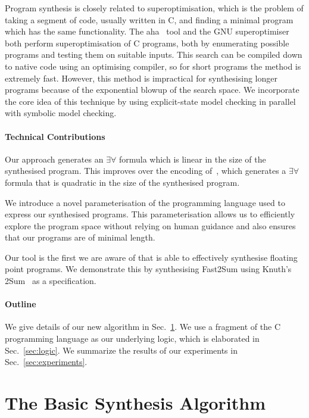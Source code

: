 \documentclass[a4paper]{llncs}
\begin{document}
Program synthesis is closely related to
superoptimisation, which is the problem of taking a
segment of code, usually written in C, and finding a minimal program which
has the same functionality.  The {\sc aha}~\cite{aha-paper,aha-website} tool and the GNU
superoptimiser~\cite{gnu-superoptimiser} both perform superoptimisation of C
programs, both by enumerating possible programs and testing them on suitable
inputs.  This search can be compiled down to native code using an optimising
compiler, so for short programs the method is extremely fast.  However, this
method is impractical for synthesising longer programs because of the
exponential blowup of the search space.  We incorporate the core idea of
this technique by using explicit-state model checking in parallel with
symbolic model checking.

\paragraph{Technical Contributions}
Our approach generates an $\exists \forall$ formula which is linear
in the size of the synthesised program.  This improves over the
encoding of~\cite{brahma}, which generates a $\exists \forall$ formula
that is quadratic in the size of the synthesised program.

We introduce a novel parameterisation of the programming language
used to express our synthesised programs.
This parameterisation allows us to efficiently explore the program space
without relying on human guidance and also ensures that our programs
are of minimal length.

Our tool is the first we are aware of that is able to effectively
synthesise floating point programs.  We demonstrate this by
synthesising {\sc Fast2Sum} using Knuth's {\sc 2Sum}~\cite{taocp2} as
a specification.

\paragraph{Outline} We give details of our new algorithm in
Sec.~\ref{sec:algorithm}.  We use a fragment of the C programming language
as our underlying logic, which is elaborated in Sec.~\ref{sec:logic}. We
summarize the results of our experiments in Sec.~\ref{sec:experiments}.

\section{The Basic Synthesis Algorithm}
\label{sec:algorithm}
\end{document}

